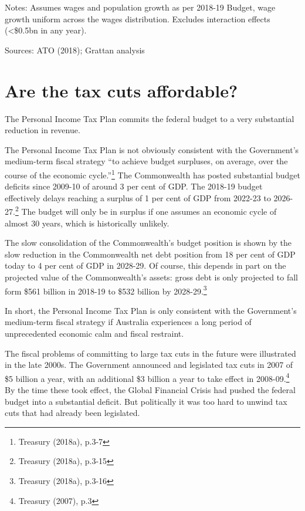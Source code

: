 \documentclass[submission]{grattan}\usepackage[]{graphicx}\usepackage[]{color}
\begin{document}


Notes: Assumes wages and population growth as per 2018-19 Budget, wage growth uniform across the wages distribution. Excludes interaction effects (\textless{}\$0.5bn in any year).

Sources: ATO (2018); Grattan analysis


\chapter{Are the tax cuts affordable? }\label{chap:are-the-tax-cuts-affordable}

The Personal Income Tax Plan commits the federal budget to a very substantial reduction in revenue.

The Personal Income Tax Plan is not obviously consistent with the Government's medium-term fiscal strategy ``to achieve budget surpluses, on average, over the course of the economic cycle.''\footnote{Treasury (2018a), p.3-7} The Commonwealth has posted substantial budget deficits since 2009-10 of around 3 per cent of GDP. The 2018-19 budget effectively delays reaching a surplus of 1 per cent of GDP from 2022-23 to 2026-27.\footnote{Treasury (2018a), p.3-15} The budget will only be in surplus if one assumes an economic cycle of almost 30 years, which is historically unlikely.

The slow consolidation of the Commonwealth's budget position is shown by the slow reduction in the Commonwealth net debt position from 18 per cent of GDP today to 4 per cent of GDP in 2028-29. Of course, this depends in part on the projected value of the Commonwealth's assets: gross debt is only projected to fall form \$561 billion in 2018-19 to \$532 billion by 2028-29.\footnote{Treasury (2018a), p.3-16}

In short, the Personal Income Tax Plan is only consistent with the Government's medium-term fiscal strategy if Australia experiences a long period of unprecedented economic calm and fiscal restraint.

The fiscal problems of committing to large tax cuts in the future were illustrated in the late 2000s. The Government announced and legislated tax cuts in 2007 of \$5 billion a year, with an additional \$3 billion a year to take effect in 2008-09.\footnote{Treasury (2007), p.3} By the time these took effect, the Global Financial Crisis had pushed the federal budget into a substantial deficit. But politically it was too hard to unwind tax cuts that had already been legislated.
\end{document}

